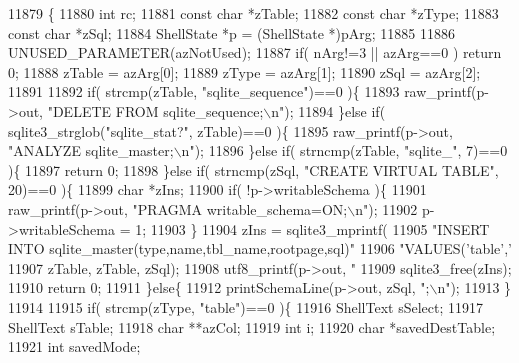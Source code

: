 \begin{DoxyCode}
11879                                                                               \{
11880   \textcolor{keywordtype}{int} rc;
11881   \textcolor{keyword}{const} \textcolor{keywordtype}{char} *zTable;
11882   \textcolor{keyword}{const} \textcolor{keywordtype}{char} *zType;
11883   \textcolor{keyword}{const} \textcolor{keywordtype}{char} *zSql;
11884   ShellState *p = (ShellState *)pArg;
11885 
11886   UNUSED_PARAMETER(azNotUsed);
11887   \textcolor{keywordflow}{if}( nArg!=3 || azArg==0 ) \textcolor{keywordflow}{return} 0;
11888   zTable = azArg[0];
11889   zType = azArg[1];
11890   zSql = azArg[2];
11891 
11892   \textcolor{keywordflow}{if}( strcmp(zTable, \textcolor{stringliteral}{"sqlite\_sequence"})==0 )\{
11893     raw_printf(p->out, \textcolor{stringliteral}{"DELETE FROM sqlite\_sequence;\(\backslash\)n"});
11894   \}\textcolor{keywordflow}{else} \textcolor{keywordflow}{if}( sqlite3_strglob(\textcolor{stringliteral}{"sqlite\_stat?"}, zTable)==0 )\{
11895     raw_printf(p->out, \textcolor{stringliteral}{"ANALYZE sqlite\_master;\(\backslash\)n"});
11896   \}\textcolor{keywordflow}{else} \textcolor{keywordflow}{if}( strncmp(zTable, \textcolor{stringliteral}{"sqlite\_"}, 7)==0 )\{
11897     \textcolor{keywordflow}{return} 0;
11898   \}\textcolor{keywordflow}{else} \textcolor{keywordflow}{if}( strncmp(zSql, \textcolor{stringliteral}{"CREATE VIRTUAL TABLE"}, 20)==0 )\{
11899     \textcolor{keywordtype}{char} *zIns;
11900     \textcolor{keywordflow}{if}( !p->writableSchema )\{
11901       raw_printf(p->out, \textcolor{stringliteral}{"PRAGMA writable\_schema=ON;\(\backslash\)n"});
11902       p->writableSchema = 1;
11903     \}
11904     zIns = sqlite3_mprintf(
11905        \textcolor{stringliteral}{"INSERT INTO sqlite\_master(type,name,tbl\_name,rootpage,sql)"}
11906        \textcolor{stringliteral}{"VALUES('table','%
11907        zTable, zTable, zSql);
11908     utf8_printf(p->out, \textcolor{stringliteral}{"%
11909     sqlite3_free(zIns);
11910     \textcolor{keywordflow}{return} 0;
11911   \}\textcolor{keywordflow}{else}\{
11912     printSchemaLine(p->out, zSql, \textcolor{stringliteral}{";\(\backslash\)n"});
11913   \}
11914 
11915   \textcolor{keywordflow}{if}( strcmp(zType, \textcolor{stringliteral}{"table"})==0 )\{
11916     ShellText sSelect;
11917     ShellText sTable;
11918     \textcolor{keywordtype}{char} **azCol;
11919     \textcolor{keywordtype}{int} i;
11920     \textcolor{keywordtype}{char} *savedDestTable;
11921     \textcolor{keywordtype}{int} savedMode;
}}
\end{DoxyCode}
